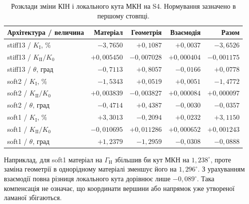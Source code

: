 \begin{table}[htbp]
 \centering
 \caption{Розклади зміни КІН і локального кута МКН на S4. Нормування зазначено в першому стовпці.}
 \label{tab:feedback-angle}
 \small
 \begin{tabular}{lrrrr}
 \toprule
 Архітектура / величина & Матеріал & Геометрія & Взаємодія & Разом\\
 \midrule
stiff13 / $K_{\mathrm I}$, \% & $-3,7650$ & $+0,1087$ & $+0,0037$ & $-3,6526$ \\
stiff13 / $K_{\mathrm{II}}/K_0$ & $+0,005450$ & $-0,007028$ & $+0,000404$ & $-0,001175$ \\
stiff13 / $\theta$, град & $-0,7113$ & $+0,8057$ & $-0,0166$ & $+0,0778$ \\
soft2 / $K_{\mathrm I}$, \% & $-1,5343$ & $+0,0519$ & $+0,0051$ & $-1,4772$ \\
soft2 / $K_{\mathrm{II}}/K_0$ & $+0,003839$ & $-0,003827$ & $+0,000084$ & $+0,000097$ \\
soft2 / $\theta$, град & $-0,4714$ & $+0,4387$ & $-0,0030$ & $-0,0357$ \\
soft1 / $K_{\mathrm I}$, \% & $+3,3013$ & $-0,2094$ & $+0,0232$ & $+3,1150$ \\
soft1 / $K_{\mathrm{II}}/K_0$ & $-0,010695$ & $+0,011286$ & $+0,000652$ & $+0,001243$ \\
soft1 / $\theta$, град & $+1,2379$ & $-1,2959$ & $-0,0308$ & $-0,0888$ \\

 \bottomrule
 \end{tabular}
\end{table}

Наприклад, для soft1 матеріал на $\Gamma_{\mathrm H}$ збільшив би кут МКН на $1{,}238^\circ$, проте заміна геометрії в однорідному матеріалі зменшує його на $1{,}296^\circ$. З урахуванням взаємодії повна різниця локального кута дорівнює лише $-0{,}089^\circ$. Така компенсація не означає, що координати вершини або напрямок уже утвореної ламаної збігаються.

